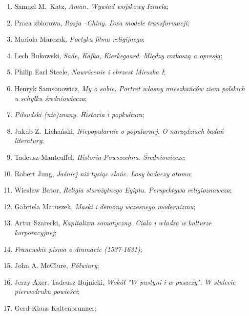 \documentclass[a4paper,11pt]{article}
\begin{document}
\begin{enumerate}
\item Samuel M.~Katz, \emph{Aman. Wywiad wojskowy Izraela};

\item Praca zbiorowa, \emph{Rosja --Chiny. Dwa modele transformacji};

\item Mariola Marczak, \emph{Poetyka filmu religijnego};

\item Lech Bukowski, \emph{Sade, Kafka, Kierkegaard. Między rozkoszą a
    opresją};

\item Philip Earl Steele, \emph{Nawrócenie i chrzest Mieszka I};

\item Henryk Samsonowicz, \emph{My o sobie. Portret własny mieszkańców
    ziem polskich u schyłku średniowiecza};

\item \emph{Piłsudski (nie)znany. Historia i popkultura};

\item Jakub Z.~Lichański, \emph{Niepopularnie o popularnej. O
    narzędziach badań literatury};

\item Tadeusz Manteuffel, \emph{Historia Powszechna. Średniowiecze};

\item Robert Jung, \emph{Jaśniej niż tysiąc słońc. Losy badaczy
    atomu};

\item Wiesław Bator, \emph{Religia starożytnego Egiptu. Perspektywa
    religioznawcza};

\item Gabriela Matuszek, \emph{Maski i demony wczesnego modernizmu};

\item Artur Szarecki, \emph{Kapitalizm somatyczny. Ciało i władza w
    kulturze korporacyjnej};

\item \emph{Francuskie pisma o dramacie (1537-1631)};

\item John A. McClure, \emph{Półwiary};

\item Jerzy Axer, Tadeusz Bujnicki, \emph{Wokół "W pustyni i w
    puszczy". W stulecie pierwodruku powieści};

\item Gerd-Klaus Kaltenbrunner;


\end{enumerate}
\end{document}
